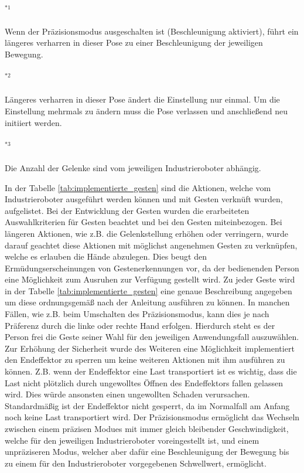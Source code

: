 \paragraph*{$^{\ast1}$}\label{ast:gesten_anmerkung_1}\small{Wenn der Präzisionsmodus ausgeschalten ist (Beschleunigung aktiviert), führt ein längeres verharren in dieser Pose zu einer Beschleunigung der jeweiligen Bewegung.}
\paragraph*{$^{\ast2}$}\label{ast:gesten_anmerkung_2}\small{Längeres verharren in dieser Pose ändert die Einstellung nur einmal. Um die Einstellung mehrmals zu ändern muss die Pose verlassen und anschließend neu initiiert werden.}
\paragraph*{$^{\ast3}$}\label{ast:gesten_anmerkung_3}\small{Die Anzahl der Gelenke sind vom jeweiligen Industrieroboter abhängig.}
\newline\newline

In der Tabelle \ref{tab:implementierte_gesten} sind die Aktionen, welche vom Industrieroboter ausgeführt werden können und mit Gesten verknüft wurden, aufgelistet. Bei der Entwicklung der Gesten wurden die erarbeiteten Auswahlkriterien für Gesten beachtet und bei den Gesten miteinbezogen. Bei längeren Aktionen, wie z.B. die Gelenkstellung erhöhen oder verringern, wurde darauf geachtet diese Aktionen mit möglichst angenehmen Gesten zu verknüpfen, welche es erlauben die Hände abzulegen. Dies beugt den Ermüdungserscheinungen von Gestenerkennungen vor, da der bedienenden Person eine Möglichkeit zum Ausruhen zur Verfügung gestellt wird. Zu jeder Geste wird in der Tabelle \ref{tab:implementierte_gesten} eine genaue Beschreibung angegeben um diese ordnungsgemäß nach der Anleitung ausführen zu können. In manchen Fällen, wie z.B. beim Umschalten des Präzisionsmodus, kann dies je nach Präferenz durch die linke oder rechte Hand erfolgen. Hierdurch steht es der Person frei die Geste seiner Wahl für den jeweiligen Anwendungsfall auszuwählen. Zur Erhöhung der Sicherheit wurde des Weiteren eine Möglichkeit implementiert den Endeffektor zu sperren um keine weiteren Aktionen mit ihm ausführen zu können. Z.B. wenn der Endeffektor eine Last transportiert ist es wichtig, dass die Last nicht plötzlich durch ungewolltes Öffnen des Endeffektors fallen gelassen wird. Dies würde ansonsten einen ungewollten Schaden verursachen. Standardmäßig ist der Endeffektor nicht gesperrt, da im Normalfall am Anfang noch keine Last transportiert wird. Der Präzisionsmodus ermöglicht das Wechseln zwischen einem präzisen Modues mit immer gleich bleibender Geschwindigkeit, welche für den jeweiligen Industrieroboter voreingestellt ist, und einem unpräziseren Modus, welcher aber dafür eine Beschleunigung der Bewegung bis zu einem für den Industrieroboter vorgegebenen Schwellwert, ermöglicht.


